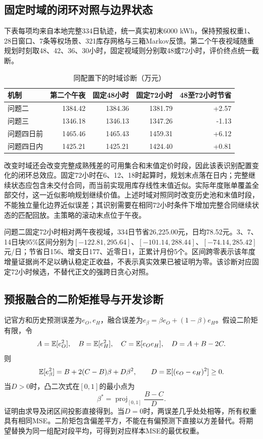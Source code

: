 \subsection{固定时域的闭环对照与边界状态}
下表每项均来自本地完整334日轨迹，统一真实初末6000 kWh，保持预报权重1、28日窗口、7条等权场景、321库存网格与三箱Markov反馈。第二个午夜视域随重规划时刻取48、42、36、30小时，固定视域则分别取48或72小时，评价终点统一截断。
\begin{table}[H]\centering\small
\caption{同配置下的时域诊断（万元）}
\begin{tabular}{lrrrr}\toprule
机制 & 第二个午夜 & 固定48小时 & 固定72小时 & 48至72小时节省\\\midrule
问题二 & 1384.42 & 1384.36 & 1381.79 & +2.57 \\
问题三 & 1346.18 & 1346.13 & 1347.26 & -1.13 \\
问题四日前 & 1465.46 & 1465.43 & 1459.31 & +6.12 \\
问题四日内 & 1425.21 & 1425.21 & 1424.40 & +0.81 \\
\bottomrule\end{tabular}\end{table}
改变时域还会改变完整成熟残差的可用集合和末值定价时段，因此该表识别配置变化的闭环总效应。固定72小时在6、12、18时起算时，规划末点落在日内；完整继续状态应包含未交付合同，而当前实现用库存线性末值近似。实际年度账单覆盖全部交付，这一近似影响规划继续价值。上述时域对照同时改变历史池和末值时段，不能独立量化边界近似误差；其识别需要在相同72小时条件下增加完整合同继续状态的匹配回放。主策略的滚动末点位于午夜。

问题二固定72小时相对两午夜视域，334日节省26,225.00元，日均78.52元。3、7、14日块95\%区间分别为$[-122.81,295.64]$、$[-101.14,288.44]$、$[-74.14,285.42]$元/日；节省日156、增支日177、近零日1，正累计月份5个。区间跨零表示该年度增量证据尚不足以确认稳定正收益，不表示真实效果已被证明为零。该诊断对应固定72小时候选，不替代正文的强跨日贪心对照。

\subsection{预报融合的二阶矩推导与开发诊断}
记官方和历史预测误差为$e_O,e_H$，融合误差为$e_\beta=\beta e_O+(1-\beta)e_H$。假设二阶矩有限，令
\begin{equation}
 A=\mathbb E[e_O^2],\quad B=\mathbb E[e_H^2],\quad C=\mathbb E[e_Oe_H],\quad D=A+B-2C.
\end{equation}
则
\begin{equation}
 \mathbb E[e_\beta^2]=B+2(C-B)\beta+D\beta^2,
 \qquad D=\mathbb E[(e_O-e_H)^2]\ge0.
\end{equation}
当$D>0$时，凸二次式在$[0,1]$的最小点为
\begin{equation}
 \beta^*=\operatorname{proj}_{[0,1]}\frac{B-C}{D}.
\end{equation}
证明由求导及闭区间投影直接得到。当$D=0$时，两误差几乎处处相等，所有权重具有相同MSE。二阶矩包含偏差平方，不能在有偏预测下直接以方差替代。将期望替换为同一组配对段平均，可得到对应样本MSE的最优权重。

